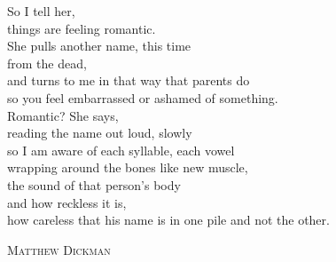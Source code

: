 \documentclass[10pt]{memoir}
\begin{document}
\begin{multicols}{2}
{So I tell her,\\
things are feeling romantic.\\
She pulls another name, this time\\
from the dead,\\
and turns to me in that way that parents do\\
so you feel embarrassed or ashamed of something.\\
Romantic? She says,\\
reading the name out loud, slowly\\
so I am aware of each syllable, each vowel\\
wrapping around the bones like new muscle,\\
the sound of that person's body\\
and how reckless it is,\\
how careless that his name is in one pile and not the other.
}

\vspace{11pt}
\hspace{44pt} \textsc{Matthew Dickman}\\
\vfill
\end{multicols}
\end{document}
